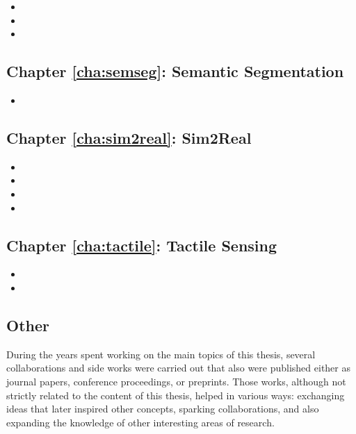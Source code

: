 \begin{itemize}
  \item {}
  \item {}
  \item {}
\end{itemize}

\subsection{Chapter \ref{cha:semseg}: Semantic Segmentation}

\begin{itemize}
  \item {}
\end{itemize}

\subsection{Chapter \ref{cha:sim2real}: Sim2Real}

\begin{itemize}
    \item {}
    \item {}
    \item {}
    \item {}
  \end{itemize}

\subsection{Chapter \ref{cha:tactile}: Tactile Sensing}

\begin{itemize}
  \item {}
  \item {}
\end{itemize}

\subsection{Other}

During the years spent working on the main topics of this thesis, several collaborations and side works were carried out that also were published either as journal papers, conference proceedings, or preprints. Those works, although not strictly related to the content of this thesis, helped in various ways: exchanging ideas that later inspired other concepts, sparking collaborations, and also expanding the knowledge of other interesting areas of research.

